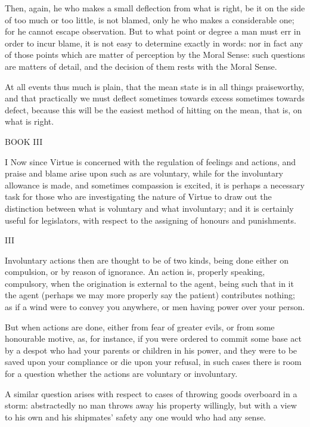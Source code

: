 Then, again, he who makes a small deflection from what is right, be it
on the side of too much or too little, is not blamed, only he who makes
a considerable one; for he cannot escape observation. But to what point
or degree a man must err in order to incur blame, it is not easy to
determine exactly in words: nor in fact any of those points which are
matter of perception by the Moral Sense: such questions are matters of
detail, and the decision of them rests with the Moral Sense.

At all events thus much is plain, that the mean state is in all things
praiseworthy, and that practically we must deflect sometimes towards
excess sometimes towards defect, because this will be the easiest method
of hitting on the mean, that is, on what is right.




BOOK III

I Now since Virtue is concerned with the regulation of feelings and
actions, and praise and blame arise upon such as are voluntary, while
for the involuntary allowance is made, and sometimes compassion is
excited, it is perhaps a necessary task for those who are investigating
the nature of Virtue to draw out the distinction between what is
voluntary and what involuntary; and it is certainly useful for
legislators, with respect to the assigning of honours and punishments.



III

Involuntary actions then are thought to be of two kinds, being
done either on compulsion, or by reason of ignorance. An action is,
properly speaking, compulsory, when the origination is external to the
agent, being such that in it the agent (perhaps we may more properly
say the patient) contributes nothing; as if a wind were to convey you
anywhere, or men having power over your person.

But when actions are done, either from fear of greater evils, or from
some honourable motive, as, for instance, if you were ordered to commit
some base act by a despot who had your parents or children in his power,
and they were to be saved upon your compliance or die upon your refusal,
in such cases there is room for a question whether the actions are
voluntary or involuntary.

A similar question arises with respect to cases of throwing goods
overboard in a storm: abstractedly no man throws away his property
willingly, but with a view to his own and his shipmates' safety any one
would who had any sense.

